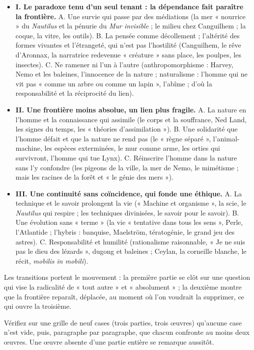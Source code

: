 \documentclass[11pt,a4paper]{article}
\providecommand{\tightlist}{\setlength{\itemsep}{0pt}\setlength{\parskip}{0pt}}
\begin{document}
\begin{itemize}
\tightlist
\item
  \textbf{I. Le paradoxe tenu d'un seul tenant : la dépendance fait paraître la frontière.} A. Une survie qui passe par des médiations (la mer « nourrice » du \emph{Nautilus} et la pénurie du \emph{Mur invisible} ; le milieu chez Canguilhem ; la coque, la vitre, les outils). B. La pensée comme décollement ; l'altérité des formes vivantes et l'étrangeté, qui n'est pas l'hostilité (Canguilhem, le rêve d'Aronnax, la narratrice redevenue « créature » sans place, les poulpes, les insectes). C. Ne ramener ni l'un à l'autre (anthropomorphisme : Harvey, Nemo et les baleines, l'innocence de la nature ; naturalisme : l'homme qui ne vit pas « comme un arbre ou comme un lapin », l'abîme ; d'où la responsabilité et la réciprocité du lien).
\item
  \textbf{II. Une frontière moins absolue, un lien plus fragile.} A. La nature en l'homme et la connaissance qui assimile (le corps et la souffrance, Ned Land, les signes du temps, les « théories d'assimilation »). B. Une solidarité que l'homme défait et que la nature ne rend pas (le « règne séparé », l'animal-machine, les espèces exterminées, le mur comme arme, les orties qui survivront, l'homme qui tue Lynx). C. Réinscrire l'homme dans la nature sans l'y confondre (les pigeons de la ville, la mer de Nemo, le mimétisme ; mais les racines de la forêt et « le génie des mers »).
\item
  \textbf{III. Une continuité sans coïncidence, qui fonde une éthique.} A. La technique et le savoir prolongent la vie (« Machine et organisme », la scie, le \emph{Nautilus} qui respire ; les techniques divinisées, le savoir pour le savoir). B. Une évolution sans « terme » (la vie « tentative dans tous les sens », Perle, l'Atlantide ; l'hybris : banquise, Maelström, tératogénie, le grand jeu des astres). C. Responsabilité et humilité (rationalisme raisonnable, « Je ne suis pas le dieu des lézards », dugong et baleines ; Ceylan, la corneille blanche, le récit, \emph{mobilis in mobili}).
\end{itemize}

Les transitions portent le mouvement : la première partie se clôt sur une question qui vise la radicalité de « tout autre » et « absolument » ; la deuxième montre que la frontière reparaît, déplacée, au moment où l'on voudrait la supprimer, ce qui ouvre la troisième.

\begin{methode}

Vérifiez sur une grille de neuf cases (trois parties, trois œuvres) qu'aucune case n'est vide, puis, paragraphe par paragraphe, que chacun confronte au moins deux œuvres. Une œuvre absente d'une partie entière se remarque aussitôt.

\end{methode}
\end{document}
